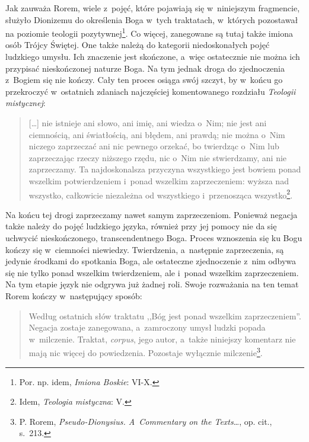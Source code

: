 Jak zauważa Rorem, wiele z~pojęć, które pojawiają się w~niniejszym fragmencie, służyło Dionizemu do określenia Boga w~tych traktatach, w~których pozostawał na poziomie teologii pozytywnej\footnote{Por. np. idem, \textit{Imiona Boskie}: VI-X.}. Co więcej, zanegowane są tutaj także imiona osób Trójcy Świętej. One także należą do kategorii niedoskonałych pojęć ludzkiego umysłu. Ich znaczenie jest skończone, a~więc ostatecznie nie można ich przypisać nieskończonej naturze Boga. Na tym jednak droga do zjednoczenia z~Bogiem się nie kończy. Cały ten proces osiąga swój szczyt, by w~końcu go przekroczyć w~ostatnich zdaniach najczęściej komentowanego rozdziału \textit{Teologii mistycznej}:

\begin{quote}
[\ldots] nie istnieje ani słowo, ani imię, ani wiedza o~Nim; nie jest ani ciemnością, ani światłością, ani błędem, ani prawdą; nie można o~Nim niczego zaprzeczać ani nic pewnego orzekać, bo twierdząc o~Nim lub zaprzeczając rzeczy niższego rzędu, nic o~Nim nie stwierdzamy, ani nie zaprzeczamy. Ta najdoskonalsza przyczyna wszystkiego jest bowiem ponad wszelkim potwierdzeniem i~ponad wszelkim zaprzeczeniem: wyższa nad wszystko, całkowicie niezależna od wszystkiego i~przenosząca wszystko\footnote{Idem, \textit{Teologia mistyczna}: V.}.
\end{quote}

Na końcu tej drogi zaprzeczamy nawet samym zaprzeczeniom. Ponieważ negacja także należy do pojęć ludzkiego języka, również przy jej pomocy nie da się uchwycić nieskończonego, transcendentnego Boga. Proces wznoszenia się ku Bogu kończy się w~ciemności niewiedzy. Twierdzenia, a~następnie zaprzeczenia, są jedynie środkami do spotkania Boga, ale ostateczne zjednoczenie z~nim odbywa się nie tylko ponad wszelkim twierdzeniem, ale i~ponad wszelkim zaprzeczeniem. Na tym etapie język nie odgrywa już żadnej roli. Swoje rozważania na ten temat Rorem kończy w~następujący sposób:

\begin{quote}
Według ostatnich słów traktatu ,,Bóg jest ponad wszelkim zaprzeczeniem''. Negacja zostaje zanegowana, a~zamroczony umysł ludzki popada w~milczenie. Traktat, \textit{corpus}, jego autor, a~także niniejszy komentarz nie mają nic więcej do powiedzenia. Pozostaje wyłącznie milczenie\footnote{P. Rorem, \textit{Pseudo-Dionysius. A~Commentary on the Texts}\ldots, op. cit., s.~213.}.
\end{quote}


